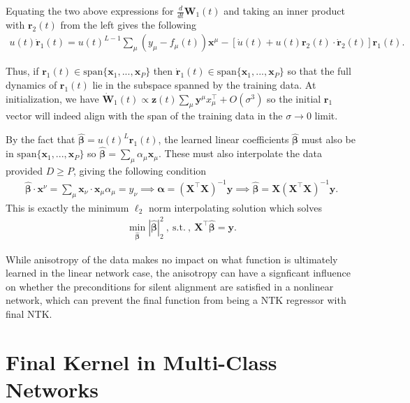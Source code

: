 \documentclass{article} %
\def\x{\bm x}
\def\W{\bm W}
\begin{document}
\begin{appendix}
Equating the two above expressions for $\frac{d}{dt} \bm W_1(t)$ and taking an inner product with $\bm r_2(t)$ from the left gives the following
\begin{align}
    u(t) \dot{ \bm r}_1(t) = u(t)^{L-1} \sum_\mu (y_\mu - f_\mu(t) ) \x^\mu - \left[ \dot{u}(t) + u(t)  \bm r_2(t) \cdot \dot{\bm r}_2(t) \right] \bm r_1(t).
\end{align}

Thus, if $\bm r_1(t) \in \text{span}\{ \x_1,...,\x_P \}$ then $\dot{\bm r}_1(t) \in \text{span}\{ \x_1,...,\x_P \}$ so that the full dynamics of $\bm r_1(t)$ lie in the subspace spanned by the training data. At initialization, we have $\dot{\W}_1(t) \propto \bm z(t) \sum_\mu \bm  y^\mu x_\mu^\top + O(\sigma^3)$ so the initial $\bm r_1$ vector will indeed align with the span of the training data in the $\sigma \to 0$ limit.

By the fact that $\bm{\hat \beta} = u(t)^L \bm r_1(t)$, the learned linear coefficients $\hat{\bm{\beta}}$ must also be in $\text{span}\{ \x_1,...,\x_P \}$ so $\bm{\hat \beta} = \sum_\mu \alpha_\mu \x_\mu$.  These must also interpolate the data provided $D \geq P$, giving the following condition 
\begin{align}
    \bm{\hat \beta} \cdot \x^\nu = \sum_{\mu} \x_{\nu} \cdot \x_\mu \alpha_\mu = y_\nu \implies \bm\alpha = (\bm X^\top \bm X)^{-1} \bm y \implies \bm{\hat \beta} = \bm X (\bm X^\top \bm X)^{-1} \bm y.
\end{align}
This is exactly the minimum $\ell_2$ norm interpolating solution which solves 
\begin{align}
    \min_{\bm{\hat \beta}} |\bm{\hat \beta}|_2^2 \ , \ \text{s.t.} \ , \ \bm X^\top \bm{\hat \beta } = \bm y.
\end{align}

While anisotropy of the data makes no impact on what function is ultimately learned in the linear network case, the anisotropy can have a signficant influence on whether the preconditions for silent alignment are satisfied in a nonlinear network, which can prevent the final function from being a NTK regressor with final NTK.

\section{Final Kernel in Multi-Class Networks}\label{app:multi-class}


\end{appendix}
\end{document}
